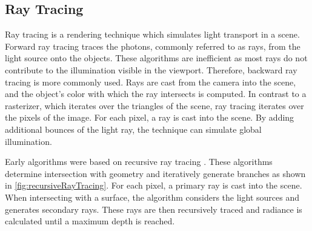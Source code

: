 \subsection{Ray Tracing}
\label{ch:rayTracingTheory}

Ray tracing is a rendering technique which simulates light transport in a scene. Forward ray tracing traces the photons, commonly referred to as rays, from the light source onto the objects. These algorithms are inefficient as most rays do not contribute to the illumination visible in the viewport. Therefore, backward ray tracing is more commonly used. Rays are cast from the camera into the scene, and the object's color with which the ray intersects is computed. In contrast to a rasterizer, which iterates over the triangles of the scene, ray tracing iterates over the pixels of the image. For each pixel, a ray is cast into the scene. By adding additional bounces of the light ray, the technique can simulate global illumination.

Early algorithms were based on recursive ray tracing \cite{whittedGlobalIllumination}. These algorithms determine intersection with geometry and iteratively generate branches as shown in \autoref{fig:recursiveRayTracing}. For each pixel, a primary ray is cast into the scene. When intersecting with a surface, the algorithm considers the light sources and generates secondary rays. These rays are then recursively traced and radiance is calculated until a maximum depth is reached.

